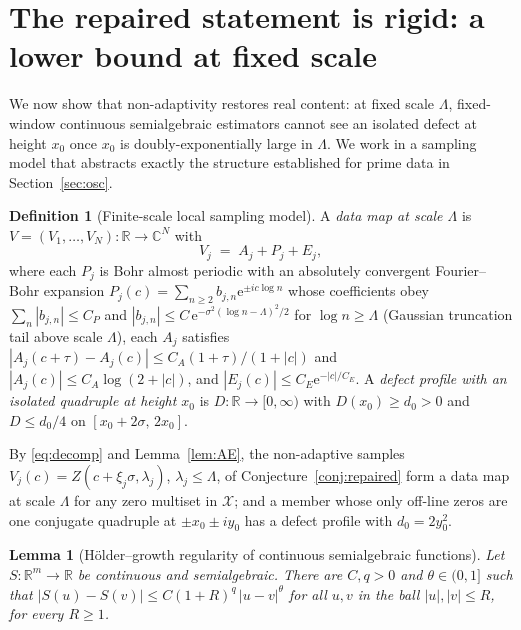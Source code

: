 \documentclass[11pt]{amsart}
\newtheorem{lemma}[theorem]{Lemma}
\theoremstyle{definition}
\newtheorem{definition}[theorem]{Definition}
\theoremstyle{remark}
\newcommand{\CC}{\mathbb{C}}
\newcommand{\RR}{\mathbb{R}}
\newcommand{\eE}{\mathrm{e}}
\begin{document}
\section{The repaired statement is rigid: a lower bound at fixed scale}\label{sec:lower}

We now show that non-adaptivity restores real content: at fixed scale $\Lambda$, fixed-window continuous semialgebraic estimators cannot see an isolated defect at height $x_0$ once $x_0$ is doubly-exponentially large in $\Lambda$. We work in a sampling model that abstracts exactly the structure established for prime data in Section~\ref{sec:osc}.

\begin{definition}[Finite-scale local sampling model]\label{def:model}
A \emph{data map at scale $\Lambda$} is $V=(V_1,\dots,V_N):\RR\to\CC^N$ with
\[
V_j\;=\;A_j+P_j+E_j,
\]
where each $P_j$ is Bohr almost periodic with an absolutely convergent Fourier--Bohr expansion $P_j(c)=\sum_{n\ge2}b_{j,n}\eE^{\pm ic\log n}$ whose coefficients obey $\sum_n|b_{j,n}|\le C_P$ and $|b_{j,n}|\le C\,\eE^{-\sigma^2(\log n-\Lambda)^2/2}$ for $\log n\ge\Lambda$ (Gaussian truncation tail above scale $\Lambda$), each $A_j$ satisfies $|A_j(c+\tau)-A_j(c)|\le C_A(1+\tau)/(1+|c|)$ and $|A_j(c)|\le C_A\log(2+|c|)$, and $|E_j(c)|\le C_E\eE^{-|c|/C_E}$. A \emph{defect profile with an isolated quadruple at height $x_0$} is $D:\RR\to[0,\infty)$ with $D(x_0)\ge d_0>0$ and $D\le d_0/4$ on $[x_0+2\sigma,\,2x_0]$.
\end{definition}

By \eqref{eq:decomp} and Lemma~\ref{lem:AE}, the non-adaptive samples $V_j(c)=Z(c+\xi_j\sigma,\lambda_j)$, $\lambda_j\le\Lambda$, of Conjecture~\ref{conj:repaired} form a data map at scale $\Lambda$ for any zero multiset in $\mathcal X$; and a member whose only off-line zeros are one conjugate quadruple at $\pm x_0\pm iy_0$ has a defect profile with $d_0=2y_0^2$.

\begin{lemma}[H\"older--growth regularity of continuous semialgebraic functions]\label{lem:holder}
Let $S:\RR^m\to\RR$ be continuous and semialgebraic. There are $C,q>0$ and $\theta\in(0,1]$ such that $|S(u)-S(v)|\le C(1+R)^q\,|u-v|^\theta$ for all $u,v$ in the ball $|u|,|v|\le R$, for every $R\ge1$.
\end{lemma}
\end{document}
